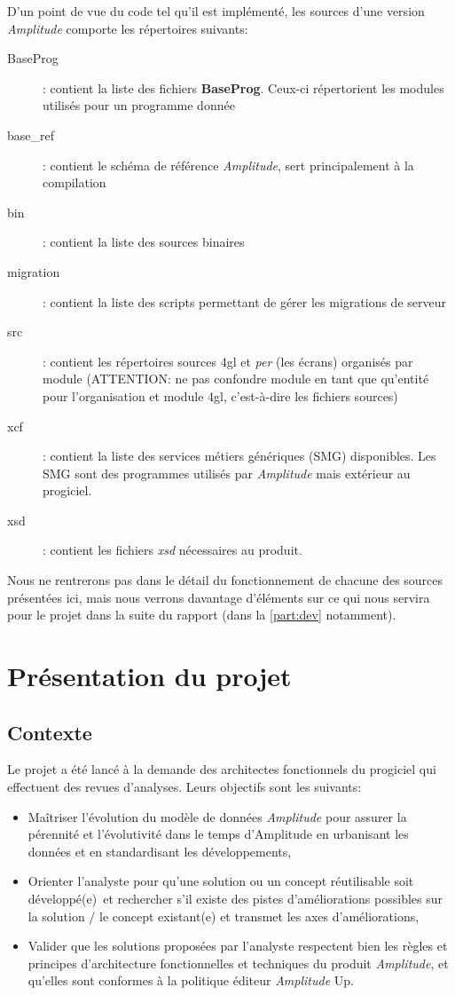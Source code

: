 \documentclass{polytech/polytech}
\begin{document}
D'un point de vue du code tel qu'il est implémenté, les sources d'une version \textit{Amplitude} comporte les répertoires suivants:

\begin{description}
	\item[BaseProg] : contient la liste des fichiers \textbf{BaseProg}. Ceux-ci répertorient les modules utilisés pour un programme donnée
	\item[base\_ref] : contient le schéma de référence \textit{Amplitude}, sert principalement à la compilation
	\item[bin] : contient la liste des sources binaires
	\item[migration] : contient la liste des scripts permettant de gérer les migrations de serveur
	\item[src] : contient les répertoires sources 4gl et \textit{per} (les écrans) organisés par module (ATTENTION: ne pas confondre module en tant que qu'entité pour l'organisation et module 4gl, c'est-à-dire les fichiers sources)
	\item[xcf] : contient la liste des services métiers génériques (SMG) disponibles. Les SMG sont des programmes utilisés par \textit{Amplitude} mais extérieur au progiciel.
	\item[xsd] : contient les fichiers \textit{xsd} nécessaires au produit.
\end{description}

Nous ne rentrerons pas dans le détail du fonctionnement de chacune des sources présentées ici, mais nous verrons davantage d'éléments sur ce qui nous servira pour le projet dans la suite du rapport (dans la \autoref{part:dev} notamment).


\chapter{Présentation du projet}


\section{Contexte}

Le projet a été lancé à la demande des architectes fonctionnels du progiciel qui effectuent des revues d'analyses. Leurs objectifs sont les suivants:

\begin{itemize}
	\item Maîtriser l’évolution du modèle de données \textit{Amplitude} pour assurer la pérennité et l’évolutivité dans le temps d’Amplitude en urbanisant les données et en standardisant les développements,
	\item Orienter l’analyste pour qu’une solution ou un concept réutilisable soit développé(e) et rechercher s’il existe des pistes d’améliorations possibles sur la solution / le concept existant(e) et transmet les axes d’améliorations,
	\item Valider que les solutions proposées par l’analyste respectent bien les règles et principes d’architecture fonctionnelles et techniques du produit \textit{Amplitude}, et qu’elles sont conformes à la politique éditeur \textit{Amplitude} Up.
\end{itemize}
\end{document}
